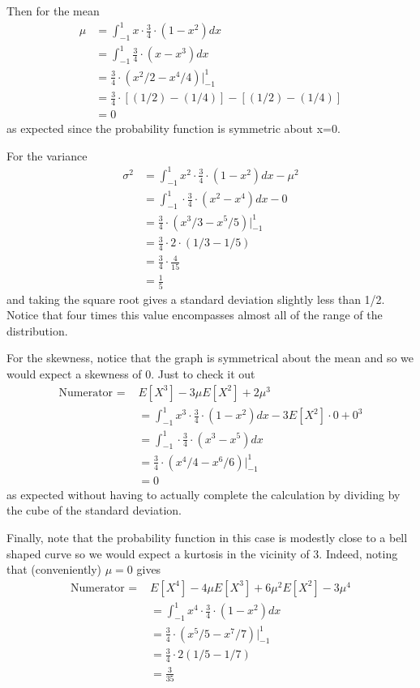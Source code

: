 \documentclass[10pt,]{book}
\theoremstyle{plain}
\theoremstyle{definition}
\theoremstyle{definition}
\theoremstyle{definition}
\numberwithin{equation}{section}
\begin{document}
	Then for the mean
	\begin{align*}
\mu & = \int_{-1}^1 x \cdot \frac{3}{4} \cdot (1-x^2) dx\\
 & = \int_{-1}^1 \frac{3}{4} \cdot (x-x^3) dx\\
 & = \frac{3}{4} \cdot (x^2/2-x^4/4) \big |_{-1}^1\\
 & = \frac{3}{4} \cdot [(1/2)-(1/4)] - [(1/2) - (1/4)]\\
 & = 0
\end{align*}
	as expected since the probability function is symmetric about x=0.
\par
For the variance
	\begin{align*}
\sigma^2 & = \int_{-1}^1 x^2 \cdot \frac{3}{4} \cdot (1-x^2) dx - \mu^2\\
 & = \int_{-1}^1 \cdot \frac{3}{4} \cdot (x^2-x^4) dx - 0\\
 & = \frac{3}{4} \cdot (x^3 /3 -x^5 / 5) \big |_{-1}^1\\
 & = \frac{3}{4} \cdot 2 \cdot (1/3-1/5)\\
 & = \frac{3}{4} \cdot \frac{4}{15}\\
 & = \frac{1}{5}
\end{align*}
	and taking the square root gives a standard deviation slightly less than 1/2. Notice that four times this value encompasses almost all of the range of the distribution.
\par
For the skewness, notice that the graph is symmetrical about the mean and so we would expect a skewness of 0.  Just to check it out
	\begin{align*}
 \text{Numerator = } & E[X^3] - 3 \mu E[X^2] + 2\mu^3\\
 & = \int_{-1}^1 x^3 \cdot \frac{3}{4} \cdot (1-x^2) dx - 3 E[X^2] \cdot 0 + 0^3 \\
 & = \int_{-1}^1 \cdot \frac{3}{4} \cdot (x^3-x^5) dx\\
 & = \frac{3}{4} \cdot (x^4/4-x^6/6) \big |_{-1}^1\\
 & = 0
\end{align*}
	as expected without having to actually complete the calculation by dividing by the cube of the standard deviation.
\par
Finally, note that the probability function in this case is modestly close to a bell shaped curve so we would expect a kurtosis in the vicinity of 3. Indeed, noting that (conveniently) \(\mu = 0\) gives
	\begin{align*}
 \text{Numerator = } & E[X^4] - 4 \mu E[X^3] + 6 \mu^2 E[X^2] - 3 \mu^4\\
 & = \int_{-1}^1 x^4 \cdot \frac{3}{4} \cdot (1-x^2) dx\\
 & = \frac{3}{4} \cdot (x^5 /5-x^7 /7) \big |_{-1}^1\\
 & = \frac{3}{4} \cdot 2(1/5-1/7)\\
 & = \frac{3}{35}
\end{align*}
\end{document}
